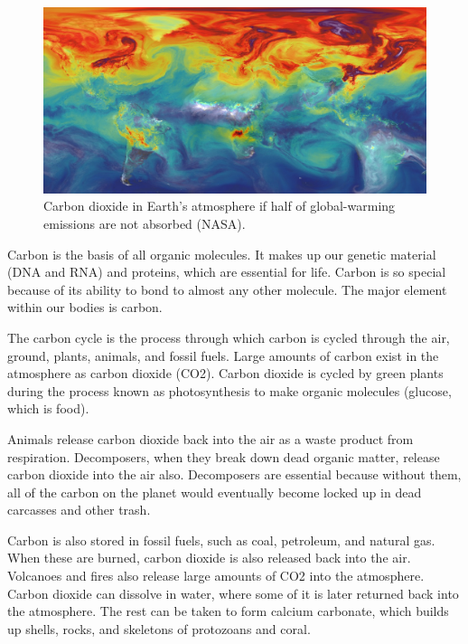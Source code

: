\documentclass[]{book}
\begin{document}
\begin{figure}

{\centering \includegraphics[width=1\linewidth]{figures/co2-atmosphere} 

}

\caption{Carbon dioxide in Earth's atmosphere if half of global-warming emissions are not absorbed (NASA).}\label{fig:co2-atmosphere}
\end{figure}

Carbon is the basis of all organic molecules. It makes up our genetic
material (DNA and RNA) and proteins, which are essential for life.
Carbon is so special because of its ability to bond to almost any other
molecule. The major element within our bodies is carbon.

The carbon cycle is the process through which carbon is cycled through
the air, ground, plants, animals, and fossil fuels. Large amounts of
carbon exist in the atmosphere as carbon dioxide (CO2). Carbon dioxide
is cycled by green plants during the process known as photosynthesis to
make organic molecules (glucose, which is food).

Animals release carbon dioxide back into the air as a waste product from
respiration. Decomposers, when they break down dead organic matter,
release carbon dioxide into the air also. Decomposers are essential
because without them, all of the carbon on the planet would eventually
become locked up in dead carcasses and other trash.

Carbon is also stored in fossil fuels, such as coal, petroleum, and
natural gas. When these are burned, carbon dioxide is also released back
into the air. Volcanoes and fires also release large amounts of CO2 into
the atmosphere. Carbon dioxide can dissolve in water, where some of it
is later returned back into the atmosphere. The rest can be taken to
form calcium carbonate, which builds up shells, rocks, and skeletons of
protozoans and coral.
\end{document}
